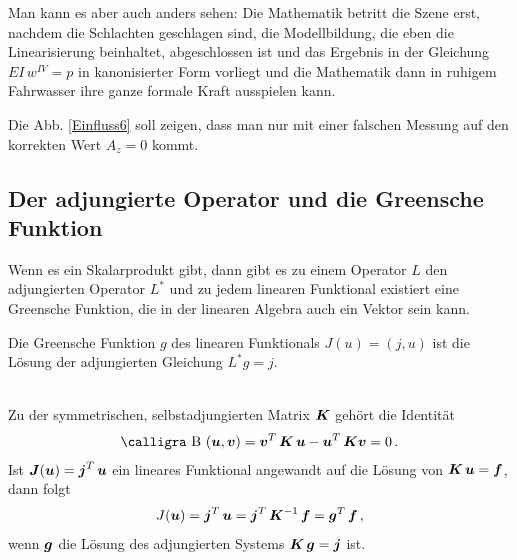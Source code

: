 Man kann es aber auch anders sehen: Die Mathematik betritt die Szene erst, nachdem die Schlachten geschlagen sind, die Modellbildung, die eben die Linearisierung beinhaltet, abgeschlossen ist und das Ergebnis in der Gleichung $EI\,w^{IV} = p$ in kanonisierter Form vorliegt und die Mathematik dann in ruhigem Fahrwasser ihre ganze formale Kraft ausspielen kann.

Die Abb. \ref{Einfluss6} soll zeigen, dass man nur mit einer \glq falschen Messung\grq{} auf den korrekten Wert $A_z = 0$ kommt.

\textcolor{sectionTitleBlue}{\section{Der adjungierte Operator und die Greensche Funktion}}
Wenn es ein Skalarprodukt gibt, dann gibt es zu einem Operator $L$ den adjungierten Operator $L^*$ und zu jedem linearen Funktional existiert eine Greensche Funktion, die in der linearen Algebra auch ein Vektor sein kann. \\

\hspace*{-12pt}\colorbox{highlightBlue}{\parbox{0.98\textwidth}{
Die Greensche Funktion $g$ des linearen Funktionals $J(u) = (j, u)$ ist die L\"{o}sung der adjungierten Gleichung $L^* g = j$.}}\\

Zu der symmetrischen, selbstadjungierten Matrix $\mbox{\boldmath $K$}$ geh\"{o}rt die Identit\"{a}t
\begin{align}
\text{\normalfont\calligra B\,\,}(\vek u,\vek v)  = \vek v^T\,\vek K\,\vek u - \vek u^T\,\vek K\vek v = 0\,.
\end{align}
Ist $\mbox{\boldmath $J$}(\mbox{\boldmath $u$}) = \mbox{\boldmath $j$}^T\,\mbox{\boldmath $u$}$ ein lineares Funktional angewandt auf die L\"{o}sung von $\mbox{\boldmath $K$}\,\mbox{\boldmath $u$} = \mbox{\boldmath $f$}$, dann folgt
\begin{align}
J(\mbox{\boldmath $u$}) = \mbox{\boldmath $j$}^T\,\mbox{\boldmath $u$} = \mbox{\boldmath $j$}^T\,\mbox{\boldmath $K$}^{-1}\,\mbox{\boldmath $f$} = \mbox{\boldmath $g$}^T\,\mbox{\boldmath $f$}\,,
\end{align}
wenn $\mbox{\boldmath $g$}$ die L\"{o}sung des adjungierten Systems $\mbox{\boldmath $K$}\,\mbox{\boldmath $g$} = \mbox{\boldmath $j$}$ ist.

